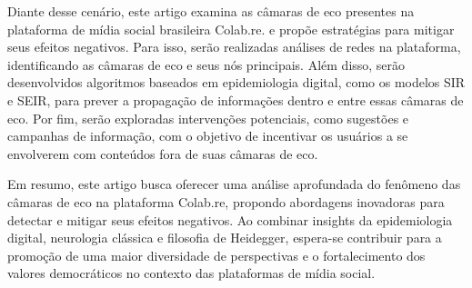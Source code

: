 Diante desse cenário, este artigo examina as câmaras de eco presentes na plataforma de mídia social brasileira Colab.re. e propõe estratégias para mitigar seus efeitos negativos. Para isso, serão realizadas análises de redes na plataforma, identificando as câmaras de eco e seus nós principais. Além disso, serão desenvolvidos algoritmos baseados em epidemiologia digital, como os modelos SIR e SEIR, para prever a propagação de informações dentro e entre essas câmaras de eco. Por fim, serão exploradas intervenções potenciais, como sugestões e campanhas de informação, com o objetivo de incentivar os usuários a se envolverem com conteúdos fora de suas câmaras de eco.

Em resumo, este artigo busca oferecer uma análise aprofundada do fenômeno das câmaras de eco na plataforma Colab.re, propondo abordagens inovadoras para detectar e mitigar seus efeitos negativos. Ao combinar insights da epidemiologia digital, neurologia clássica e filosofia de Heidegger, espera-se contribuir para a promoção de uma maior diversidade de perspectivas e o fortalecimento dos valores democráticos no contexto das plataformas de mídia social.